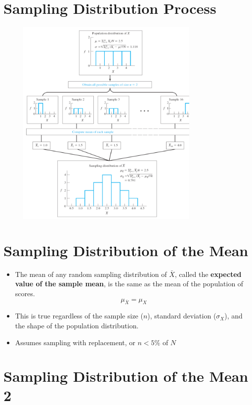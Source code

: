 \documentclass[12pt]{article}
\begin{document}
\section{Sampling Distribution
Process}\label{sampling-distribution-process}

\begin{figure}[H]
\centering
\includegraphics[width=3.5in]{sample_dist_process.png}
\caption{}
\end{figure}

\section{Sampling Distribution of the
Mean}\label{sampling-distribution-of-the-mean-1}

\begin{itemize}
\itemsep1pt\parskip0pt
\item
  The mean of any random sampling distribution of \(\bar{X}\), called
  the \textbf{expected value of the sample mean}, is the same as the
  mean of the population of scores. \[\mu_{\bar{X}} = \mu_{X}\]
\item
  This is true regardless of the sample size (\(n\)), standard deviation
  (\(\sigma_{X}\)), and the shape of the population distribution.
\item
  Assumes sampling with replacement, or \(n < 5\%\) of \(N\)
\end{itemize}

\section{Sampling Distribution of the Mean
2}\label{sampling-distribution-of-the-mean-2}
\end{document}
